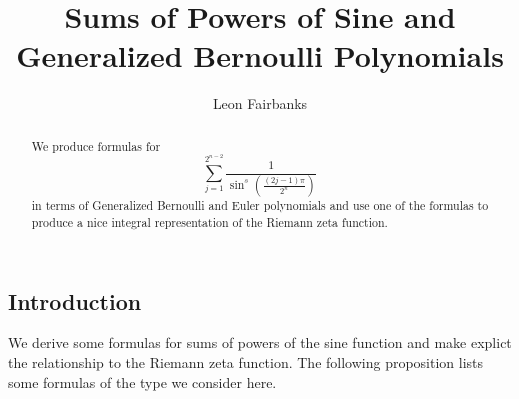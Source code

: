 \documentclass[fleqn,a4paper,9pt]{article}
\author{Leon Fairbanks}
\begin{document}
\begin{flushleft}
\title{{\textbf{Sums of Powers of Sine and Generalized Bernoulli Polynomials}}}
\maketitle
\begin{abstract}
We produce formulas for 
$$\sum_{j=1}^{2^{n-2}}\frac{1}{\sin^s\left(\frac{(2j-1)\pi}{2^n}\right)}$$\notag in terms of Generalized Bernoulli and Euler polynomials
and use one of the formulas to produce a nice integral representation of the Riemann zeta function.
\end{abstract}
\tableofcontents

\newtheorem{theorem}{Theorem}[section]
\newtheorem{lemma}[theorem]{Lemma}
\newtheorem{proposition}[theorem]{Proposition}
\newtheorem{corollary}[theorem]{Corollary}
\newtheorem{definition}[theorem]{Definition}

\section{Introduction}
We derive some formulas for sums of powers of the sine function and make explict the relationship to the Riemann zeta function. The following proposition lists some formulas of the type we consider here.



\end{flushleft}
\end{document}
